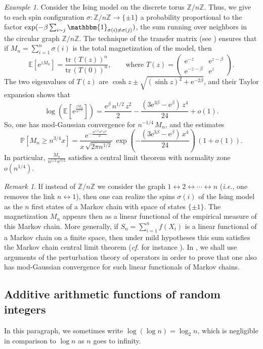 \documentclass[12pt,a4paper,reqno]{amsart}
\theoremstyle{remark}
\newtheorem{example}[lemma]{Example}
\newtheorem{remark}[lemma]{Remark}
\newcommand{\Z}{\mathbb{Z}}
\newcommand{\E}{\mathrm{e}}
\newcommand{\esper}{\mathbb{E}}
\newcommand{\proba}{\mathbb{P}}
\begin{document}
\begin{example}\label{ex:ising}
Consider the Ising model on the discrete torus $\Z/n\Z$. Thus, we give to each spin configuration $\sigma : \Z/n\Z \to\{\pm1\}$ a probability proportional to the factor $\exp(-\beta \sum_{i \sim j} \mathbbm{1}_{\sigma(i)\neq \sigma(j)})$, the sum running over neighbors in the circular graph $\Z/n\Z$. The technique of the transfer matrix (see \cite[Chapter 2]{Baxter82}) ensures that if $M_n=\sum_{i=1}^n \sigma(i)$ is the total magnetization of the model, then
$$\esper[\E^{zM_n}]=\frac{\mathrm{tr}\, (T(z))^n}{\mathrm{tr}\, (T(0))^n},\qquad\text{where }T(z)=\begin{pmatrix}\E^{-z} & \E^{z-\beta}\\
\E^{-z-\beta}&\E^z\end{pmatrix}.$$
The two eigenvalues of $T(z)$ are $\cosh z \pm \sqrt{(\sinh z)^2 +\E^{-2\beta}}$, and their Taylor expansion shows that
$$\log \left(\esper\!\left[\E^{\frac{zM_n}{n^{1/4}}}\right]\right)=\frac{\E^\beta\,n^{1/2}\,z^2}{2}-\frac{(3\E^{3\beta}-\E^\beta)\,z^4}{24}+o(1).$$
So, one has mod-Gaussian convergence for $n^{-1/4}\,M_n$, and the estimates
$$\proba[M_n \geq n^{3/4}x]=\frac{\E^{-\frac{n^{1/2}\,\E^\beta\,x^2}{2}}}{x\,\sqrt{2\pi n^{1/2}}}\,\exp\left(-\frac{(3\E^{3\beta}-\E^\beta)\,x^4}{24}\right)\,(1+o(1)).$$
In particular, $\frac{M_n}{n^{1/2}\,\E^{\beta/2}}$ satisfies a central limit theorem with normality zone $o(n^{1/4})$.
\end{example}
\medskip

\begin{remark}
If instead of $\Z/n\Z$ we consider the graph $1 \leftrightarrow 2 \leftrightarrow \cdots \leftrightarrow n$ (\emph{i.e.}, one removes the link $n \leftrightarrow 1$), then one can realize the spins $\sigma(i)$ of the Ising model as the $n$ first states of a Markov chain with space of states $\{\pm 1\}$. The magnetization $M_n$ appears then as a linear functional of the empirical measure of this Markov chain. More generally, if $S_n = \sum_{i=1}^n f(X_i)$ is a linear functional of a Markov chain on a finite space, then under mild hypotheses this sum satisfies the Markov chain central limit theorem (\emph{cf.} for instance \cite{Cog72}). In \cite{FMN14}, we shall use arguments of the perturbation theory of operators in order to prove that one also has mod-Gaussian convergence for such linear functionals of Markov chains.
\end{remark}
\bigskip



\subsection{Additive arithmetic functions of random integers} 
\label{subsec:arithmetic} In this paragraph, we sometimes write $\log(\log n) = \log_2 n$, which is negligible in comparison to $\log n$ as $n$ goes to infinity. 
\end{document}
